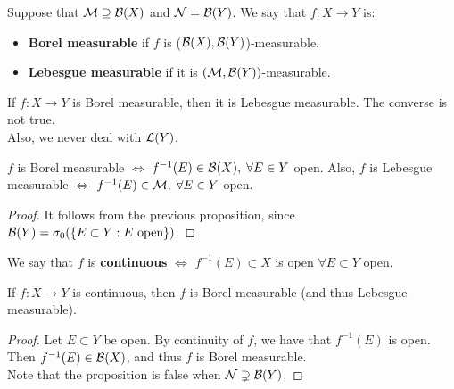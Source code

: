 \begin{fdefinition}
    Suppose that $\mathcal{M} \supseteq \mathcal{B}(X)$ and $\mathcal{N} = \mathcal{B}(Y)$.
    We say that $f: X \to Y$ is:
    \vspace{1em}

    \begin{itemize}
        \item \textbf{Borel measurable} if $f$ is ($\mathcal{B}(X),\mathcal{B}(Y)$)-measurable.
        \vspace{1em}
        \item \textbf{Lebesgue measurable} if it is $(\mathcal{M}, \mathcal{B}(Y))$-measurable.
    \end{itemize}
\end{fdefinition}

\begin{fremark}
    If $f: X \to Y$ is Borel measurable, then it is Lebesgue measurable. 
    The converse is not true.\\

    Also, we never deal with $\mathcal{L}(Y)$.
\end{fremark}

\vspace{1em}

\begin{fcorollary}
    $f$ is Borel measurable $\iff$ $f^{-1}(E) \in \mathcal{B}(X), \; \forall E \in Y$ open.
    Also, $f$ is Lebesgue measurable $\iff$ $f^{-1}(E) \in \mathcal{M}, \; \forall E \in Y$ open.
\end{fcorollary}

\begin{proof}
    It follows from the previous proposition, since $\mathcal{B}(Y) = \sigma_0(\{E \subset Y: E \text{ open}\})$.
\end{proof}

\begin{fdefinition}
    We say that $f$ is \textbf{continuous} $\iff$ $f^{-1}(E) \subset X$ is open $\forall E \subset Y$ open.
\end{fdefinition}

\begin{fproposition}
    If $f: X \to Y$ is continuous, then $f$ is Borel measurable (and thus Lebesgue measurable).
\end{fproposition}

\begin{proof}
    Let $E \subset Y$ be open. By continuity of $f$, we have that $f^{-1}(E)$ is open.
    Then $f^{-1}(E) \in \mathcal{B}(X)$, and thus $f$ is Borel measurable.\\

    Note that the proposition is false when $\mathcal{N} \supsetneq \mathcal{B}(Y)$.
\end{proof}

